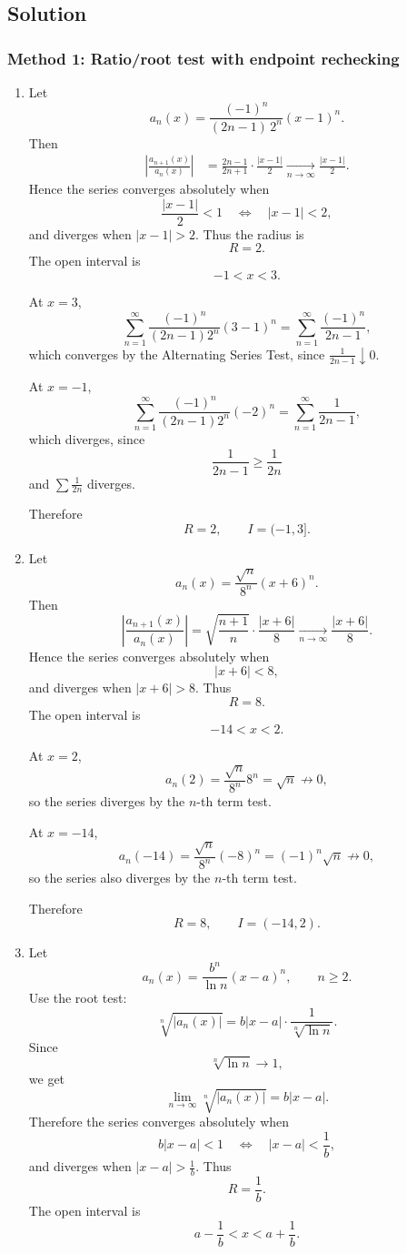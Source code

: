 \documentclass[12pt]{article}
\begin{document}
\bigskip
\subsection*{Solution}

\subsubsection*{Method 1: Ratio/root test with endpoint rechecking}
\begin{enumerate}[label=(\alph*)]
\item Let
\[
a_n(x)=\frac{(-1)^n}{(2n-1)\,2^n}(x-1)^n.
\]
Then
\begin{align*}
\left|\frac{a_{n+1}(x)}{a_n(x)}\right|
&=
\frac{2n-1}{2n+1}\cdot\frac{|x-1|}{2}
\xrightarrow[n\to\infty]{}
\frac{|x-1|}{2}.
\end{align*}
Hence the series converges absolutely when
\[
\frac{|x-1|}{2}<1
\quad\Longleftrightarrow\quad
|x-1|<2,
\]
and diverges when \(|x-1|>2\). Thus the radius is
\[
\boxed{R=2}.
\]
The open interval is
\[
-1<x<3.
\]

At \(x=3\),
\[
\sum_{n=1}^{\infty}\frac{(-1)^n}{(2n-1)2^n}(3-1)^n
=
\sum_{n=1}^{\infty}\frac{(-1)^n}{2n-1},
\]
which converges by the Alternating Series Test, since \(\frac1{2n-1}\downarrow0\).

At \(x=-1\),
\[
\sum_{n=1}^{\infty}\frac{(-1)^n}{(2n-1)2^n}(-2)^n
=
\sum_{n=1}^{\infty}\frac1{2n-1},
\]
which diverges, since
\[
\frac1{2n-1}\ge \frac1{2n}
\]
and \(\sum \frac1{2n}\) diverges.

Therefore
\[
\boxed{R=2,\qquad I=(-1,3]}.
\]

\item Let
\[
a_n(x)=\frac{\sqrt n}{8^n}(x+6)^n.
\]
Then
\[
\left|\frac{a_{n+1}(x)}{a_n(x)}\right|
=
\sqrt{\frac{n+1}{n}}\cdot\frac{|x+6|}{8}
\xrightarrow[n\to\infty]{}
\frac{|x+6|}{8}.
\]
Hence the series converges absolutely when
\[
|x+6|<8,
\]
and diverges when \(|x+6|>8\). Thus
\[
\boxed{R=8}.
\]
The open interval is
\[
-14<x<2.
\]

At \(x=2\),
\[
a_n(2)=\frac{\sqrt n}{8^n}8^n=\sqrt n\not\to0,
\]
so the series diverges by the \(n\)-th term test.

At \(x=-14\),
\[
a_n(-14)=\frac{\sqrt n}{8^n}(-8)^n=(-1)^n\sqrt n\not\to0,
\]
so the series also diverges by the \(n\)-th term test.

Therefore
\[
\boxed{R=8,\qquad I=(-14,2)}.
\]

\newpage
\item Let
\[
a_n(x)=\frac{b^n}{\ln n}(x-a)^n,\qquad n\ge2.
\]
Use the root test:
\[
\sqrt[n]{|a_n(x)|}
=
b|x-a|\cdot\frac1{\sqrt[n]{\ln n}}.
\]
Since
\[
\sqrt[n]{\ln n}\to1,
\]
we get
\[
\lim_{n\to\infty}\sqrt[n]{|a_n(x)|}
=
b|x-a|.
\]
Therefore the series converges absolutely when
\[
b|x-a|<1
\quad\Longleftrightarrow\quad
|x-a|<\frac1b,
\]
and diverges when \(|x-a|>\frac1b\). Thus
\[
\boxed{R=\frac1b}.
\]
The open interval is
\[
a-\frac1b<x<a+\frac1b.
\]


\end{enumerate}
\end{document}
